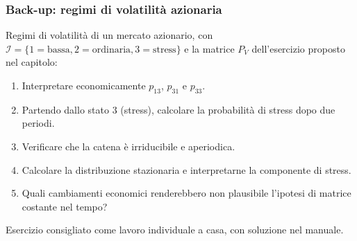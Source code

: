 \begin{frame}%
%

\frametitle{Back-up: regimi di volatilit\`{a} azionaria}%


Regimi di volatilit\`{a} di un mercato azionario, con $\mathcal{I}%
=\{1=\text{bassa},2=\text{ordinaria},3=\text{stress}\}$ e la matrice $P_{V}$
dell'esercizio proposto nel capitolo:

\medskip

\begin{enumerate}
\item[1.] Interpretare economicamente $p_{13}$, $p_{31}$ e $p_{33}$.

\item[2.] Partendo dallo stato $3$ (stress), calcolare la probabilit\`{a} di
stress dopo due periodi.

\item[3.] Verificare che la catena \`{e} irriducibile e aperiodica.

\item[4.] Calcolare la distribuzione stazionaria e interpretarne la componente
di stress.

\item[5.] Quali cambiamenti economici renderebbero non plausibile l'ipotesi di
matrice costante nel tempo?
\end{enumerate}

\medskip

\begin{center}
{\small Esercizio consigliato come lavoro individuale a casa, con soluzione
nel manuale.}
\end{center}

%

\transboxout
\end{frame}%



